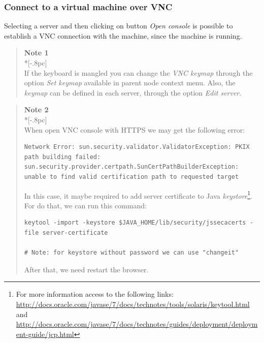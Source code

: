 \subsubsection{Connect to a virtual machine over VNC}
\label{sec:open_vnc}

Selecting a server and then clicking on button \emph{Open console} is possible to establish a VNC connection with the machine, since the machine is running.

\begin{quote}
	{\large \bf Note 1} \\*[-.8pc]
	\underline{\hspace{6in}} \\
    If the keyboard is mangled you can change the \emph{VNC keymap} through the option \emph{Set keymap} available in parent node context menu.
    Also, the \emph{keymap} can be defined in each server, through the option \emph{Edit server}.
\end{quote}

\begin{quote}
	{\large \bf Note 2} \\*[-.8pc]
	\underline{\hspace{6in}} \\

    When open VNC console with HTTPS we may get the following error:

\begin{verbatim}
Network Error: sun.security.validator.ValidatorException: PKIX path building failed: sun.security.provider.certpath.SunCertPathBuilderException: unable to find valid certification path to requested target
\end{verbatim}

    In this case, it maybe required to add server certificate to Java \emph{keystore}\footnote{For more information access to the following links: \url{http://docs.oracle.com/javase/7/docs/technotes/tools/solaris/keytool.html} and \url{http://docs.oracle.com/javase/7/docs/technotes/guides/deployment/deployment-guide/jcp.html} }.
    For do that, we can run this command:

\begin{verbatim}
keytool -import -keystore $JAVA_HOME/lib/security/jssecacerts -file server-certificate

# Note: for keystore without password we can use "changeit"
\end{verbatim}

    After that, we need restart the browser.

\end{quote}

